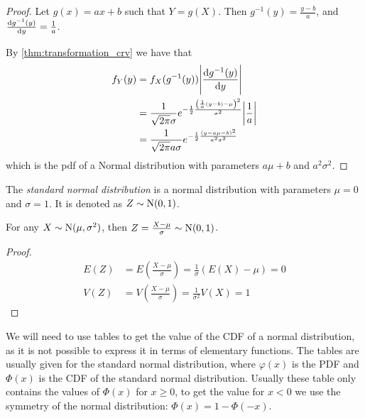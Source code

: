 \documentclass[14pt]{extarticle}
\newcommand{\Normal}{{\operatorfont N}}
\begin{document}
\begin{proof}
    Let $g(x) = ax + b$ such that $Y = g(X)$.
    Then $g^{-1}(y) = \frac{y - b}{a}$, and $\dv{g^{-1}(y)}{y} = \frac{1}{a}$.

    By \autoref{thm:transformation_crv} we have that
    \begin{align}
        f_Y(y) & = f_X(g^{-1}(y)) \abs{\dv{g^{-1}(y)}{y}}                                                                                \\
               & = \frac{1}{\sqrt{2\pi} \sigma} e^{-\frac{1}{2} \frac{\left(\frac{1}{a}(y-b)- \mu\right)^2}{\sigma^2}} \abs{\frac{1}{a}} \\
               & = \frac{1}{\sqrt{2\pi} a \sigma} e^{-\frac{1}{2} \frac{(y - a\mu - b)^2}{a^2 \sigma^2}}
    \end{align}
    which is the pdf of a Normal distribution with parameters $a\mu + b$ and $a^2 \sigma^2$.
\end{proof}

\begin{definition}
    The \emph{standard normal distribution} is a normal distribution with parameters $\mu = 0$ and $\sigma = 1$. It is denoted as $Z \sim \Normal(0, 1)$.
\end{definition}

\begin{lemma}
    For any $X \sim \Normal(\mu, \sigma^2)$, then $Z = \frac{X - \mu}{\sigma} \sim \Normal(0, 1)$.
\end{lemma}

\begin{proof}
    \begin{align}
        E(Z) & = E\left(\frac{X - \mu}{\sigma}\right) = \frac{1}{\sigma} (E(X) - \mu) = 0 \\
        V(Z) & = V\left(\frac{X - \mu}{\sigma}\right) = \frac{1}{\sigma^2} V(X) = 1
    \end{align}
\end{proof}

\begin{remark}
    We will need to use tables to get the value of the CDF of a normal distribution, as it is not possible to express it in terms of elementary functions.
    The tables are usually given for the standard normal distribution, where $\varphi(x)$ is the PDF and $\Phi(x)$ is the CDF of the standard normal distribution.
    Usually these table only contains the values of $\Phi(x)$ for $x \geq 0$, to get the value for $x < 0$ we use the symmetry of the normal distribution: $\Phi(x) = 1 - \Phi(-x)$.
\end{remark}
\end{document}
